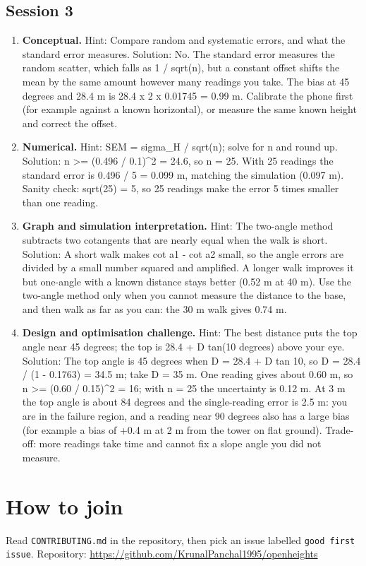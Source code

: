 \documentclass[11pt,a4paper]{article}
\begin{document}
\subsection*{Session 3}
\begin{enumerate}[nosep]
\item \textbf{Conceptual.} Hint: Compare random and systematic errors, and what the standard error measures. Solution: No. The standard error measures the random scatter, which falls as 1 / sqrt(n), but a constant offset shifts the mean by the same amount however many readings you take. The bias at 45 degrees and 28.4 m is 28.4 x 2 x 0.01745 = 0.99 m. Calibrate the phone first (for example against a known horizontal), or measure the same known height and correct the offset.
\item \textbf{Numerical.} Hint: SEM = sigma\_H / sqrt(n); solve for n and round up. Solution: n \textgreater{}= (0.496 / 0.1)\textasciicircum{}2 = 24.6, so n = 25. With 25 readings the standard error is 0.496 / 5 = 0.099 m, matching the simulation (0.097 m). Sanity check: sqrt(25) = 5, so 25 readings make the error 5 times smaller than one reading.
\item \textbf{Graph and simulation interpretation.} Hint: The two-angle method subtracts two cotangents that are nearly equal when the walk is short. Solution: A short walk makes cot a1 - cot a2 small, so the angle errors are divided by a small number squared and amplified. A longer walk improves it but one-angle with a known distance stays better (0.52 m at 40 m). Use the two-angle method only when you cannot measure the distance to the base, and then walk as far as you can: the 30 m walk gives 0.74 m.
\item \textbf{Design and optimisation challenge.} Hint: The best distance puts the top angle near 45 degrees; the top is 28.4 + D tan(10 degrees) above your eye. Solution: The top angle is 45 degrees when D = 28.4 + D tan 10, so D = 28.4 / (1 - 0.1763) = 34.5 m; take D = 35 m. One reading gives about 0.60 m, so n \textgreater{}= (0.60 / 0.15)\textasciicircum{}2 = 16; with n = 25 the uncertainty is 0.12 m. At 3 m the top angle is about 84 degrees and the single-reading error is 2.5 m: you are in the failure region, and a reading near 90 degrees also has a large bias (for example a bias of +0.4 m at 2 m from the tower on flat ground). Trade-off: more readings take time and cannot fix a slope angle you did not measure.
\end{enumerate}

\section{How to join}
Read \texttt{CONTRIBUTING.md} in the repository, then pick an issue labelled \texttt{good first issue}. Repository: \url{https://github.com/KrunalPanchal1995/openheights}
\end{document}
